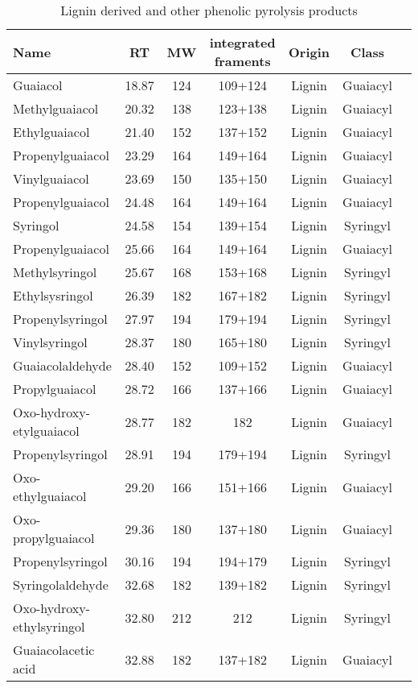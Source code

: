 \begin{table}[h!]
\begin{center}
\caption{Lignin derived and other phenolic pyrolysis products}
\label{tab:phprod}

{\small
\begin{tabular}{lcccccc}
  \hline
Name & RT & MW & integrated framents & Origin & Class \\ 
  \hline
Guaiacol & 18.87 & 124 & 109+124 &Lignin&Guaiacyl\\ 
Methylguaiacol & 20.32 & 138 & 123+138 &Lignin&Guaiacyl\\ 
Ethylguaiacol & 21.40 & 152 & 137+152 &Lignin&Guaiacyl\\ 
Propenylguaiacol & 23.29 & 164 & 149+164 &Lignin&Guaiacyl\\ 
Vinylguaiacol & 23.69 & 150 & 135+150 &Lignin&Guaiacyl\\ 
Propenylguaiacol & 24.48 & 164 & 149+164 &Lignin&Guaiacyl\\ 
Syringol & 24.58 & 154 & 139+154 &Lignin&Syringyl\\ 
Propenylguaiacol & 25.66 & 164 & 149+164 &Lignin&Guaiacyl\\ 
Methylsyringol & 25.67 & 168 & 153+168 &Lignin&Syringyl\\ 
Ethylsysringol & 26.39 & 182 & 167+182 &Lignin&Syringyl\\ 
Propenylsyringol & 27.97 & 194 & 179+194 &Lignin&Syringyl\\ 
Vinylsyringol & 28.37 & 180 & 165+180 &Lignin&Syringyl\\ 
Guaiacolaldehyde & 28.40 & 152 & 109+152 &Lignin&Guaiacyl\\ 
Propylguaiacol & 28.72 & 166 & 137+166 &Lignin&Guaiacyl\\ 
Oxo-hydroxy-etylguaiacol & 28.77 & 182 & 182 &Lignin&Guaiacyl\\ 
Propenylsyringol & 28.91 & 194 & 179+194 &Lignin&Syringyl\\ 
Oxo-ethylguaiacol & 29.20 & 166 & 151+166 &Lignin&Guaiacyl\\ 
Oxo-propylguaiacol & 29.36 & 180 & 137+180 &Lignin&Guaiacyl\\ 
Propenylsyringol & 30.16 & 194 & 194+179 &Lignin&Syringyl\\ 
Syringolaldehyde & 32.68 & 182 & 139+182 &Lignin&Syringyl\\ 
Oxo-hydroxy-ethylsyringol & 32.80 & 212 & 212 &Lignin&Syringyl\\ 
Guaiacolacetic acid & 32.88 & 182 & 137+182 &Lignin&Guaiacyl\\ 

\end{tabular}}
\end{center}
\end{table}

